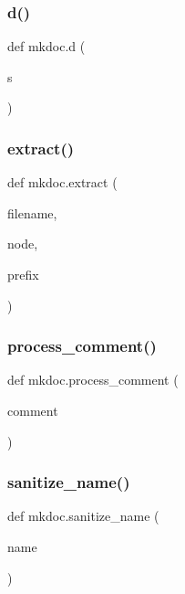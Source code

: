 \subsubsection{\texorpdfstring{d()}{d()}}
{\footnotesize\ttfamily def mkdoc.\+d (\begin{DoxyParamCaption}\item[{}]{s }\end{DoxyParamCaption})}

\mbox{\label{namespacemkdoc_a4e290cfb6c23e5bd2f57e6686b500aa4}} 
\subsubsection{\texorpdfstring{extract()}{extract()}}
{\footnotesize\ttfamily def mkdoc.\+extract (\begin{DoxyParamCaption}\item[{}]{filename,  }\item[{}]{node,  }\item[{}]{prefix }\end{DoxyParamCaption})}

\mbox{\label{namespacemkdoc_a858ea0c3045aa0c993dfa4b614a2fef0}} 
\subsubsection{\texorpdfstring{process\_comment()}{process\_comment()}}
{\footnotesize\ttfamily def mkdoc.\+process\+\_\+comment (\begin{DoxyParamCaption}\item[{}]{comment }\end{DoxyParamCaption})}

\mbox{\label{namespacemkdoc_aba928e5c95e96f8dec657143cf20618b}} 
\subsubsection{\texorpdfstring{sanitize\_name()}{sanitize\_name()}}
{\footnotesize\ttfamily def mkdoc.\+sanitize\+\_\+name (\begin{DoxyParamCaption}\item[{}]{name }\end{DoxyParamCaption})}



